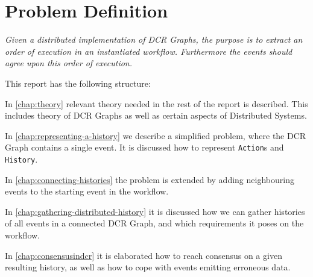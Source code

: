 \section{Problem Definition} %
	\textit{Given a distributed implementation of DCR Graphs, the purpose is to extract an order of execution in an instantiated workflow. Furthermore the events should agree upon this order of execution.}
	
	\vspace{1cm}
	
	\newpar
	This report has the following structure:
	
	\newpar
	In \autoref{chap:theory} relevant theory needed in the rest of the report is described. This includes theory of DCR Graphs as well as certain aspects of Distributed Systems. 
	
	\newpar
	In \autoref{chap:representing-a-history} we describe a simplified problem, where the DCR Graph contains a single event. It is discussed how to represent \texttt{Action}s and \texttt{History}. 
	
	\newpar
	In \autoref{chap:connecting-histories} the problem is extended by adding neighbouring events to the starting event in the workflow. 
	
	\newpar
	In \autoref{chap:gathering-distributed-history} it is discussed how we can gather histories of all events in a connected DCR Graph, and which requirements it poses on the workflow. 
	
	\newpar
	In \autoref{chap:consensusindcr} it is elaborated how to reach consensus on a given resulting history, as well as how to cope with events emitting erroneous data.